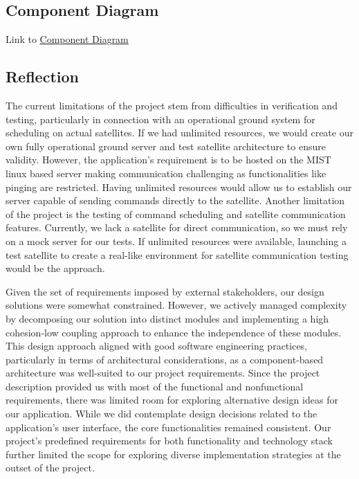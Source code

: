 \documentclass[12pt, titlepage]{article}
\begin{document}
\subsection{Component Diagram}

Link to \href{https://drive.google.com/file/d/1Ch1y_K63j26DbXrvBAeoG4raAhQos55k/view?usp=drive_link}{Component Diagram}

\subsection{Reflection}
The current limitations of the project stem from difficulties in verification and testing, particularly in connection with an operational ground system for scheduling on actual satellites. If we had unlimited resources, we would create our own fully operational ground server and test satellite architecture to ensure validity. However, the application's requirement is to be hosted on the MIST linux based server making communication challenging as functionalities like pinging are restricted. Having unlimited resources would allow us to establish our server capable of sending commands directly to the satellite. Another limitation of the project is the testing of command scheduling and satellite communication features. Currently, we lack a satellite for direct communication, so we must rely on a mock server for our tests. If unlimited resources were available, launching a test satellite to create a real-like environment for satellite communication testing would be the approach.

Given the set of requirements imposed by external stakeholders, our design solutions were somewhat constrained. However, we actively managed complexity by decomposing our solution into distinct modules and implementing a high cohesion-low coupling approach to enhance the independence of these modules. This design approach aligned with good software engineering practices, particularly in terms of architectural considerations, as a component-based architecture was well-suited to our project requirements. Since the project description provided us with most of the functional and nonfunctional requirements, there was limited room for exploring alternative design ideas for our application. While we did contemplate design decisions related to the application's user interface, the core functionalities remained consistent. Our project's predefined requirements for both functionality and technology stack further limited the scope for exploring diverse implementation strategies at the outset of the project.
\end{document}
